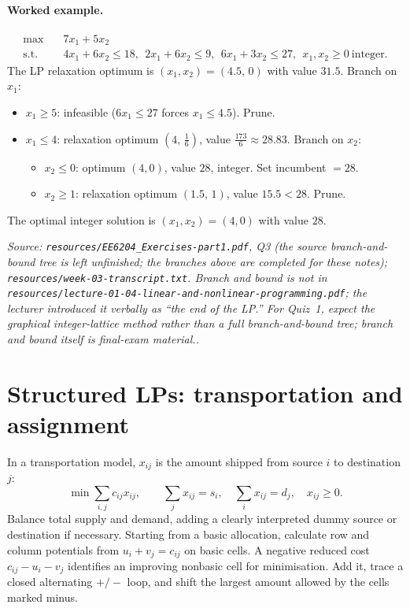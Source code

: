 \documentclass[11pt,a4paper]{article}
\renewcommand{\texttt}[1]{\nolinkurl{#1}}
\newcommand{\source}[1]{\par\smallskip\noindent\textit{Source: #1.}\par\smallskip}
\begin{document}
\paragraph{Worked example.}
\[
\begin{aligned}
 \max\quad&7x_1+5x_2\\
 \text{s.t.}\quad&4x_1+6x_2\leq18,\ \ 2x_1+6x_2\leq9,\ \ 6x_1+3x_2\leq27,\ \ x_1,x_2\geq0\ \text{integer}.
\end{aligned}
\]
The LP relaxation optimum is $(x_1,x_2)=(4.5,\,0)$ with value $31.5$. Branch on $x_1$:
\begin{itemize}
\item $x_1\geq5$: infeasible ($6x_1\leq27$ forces $x_1\leq4.5$). Prune.
\item $x_1\leq4$: relaxation optimum $(4,\,\tfrac16)$, value $\tfrac{173}{6}\approx28.83$. Branch on $x_2$:
 \begin{itemize}
 \item $x_2\leq0$: optimum $(4,0)$, value $28$, integer. Set incumbent $=28$.
 \item $x_2\geq1$: relaxation optimum $(1.5,\,1)$, value $15.5<28$. Prune.
 \end{itemize}
\end{itemize}
The optimal integer solution is $(x_1,x_2)=(4,0)$ with value $28$.
\source{\texttt{resources/EE6204\_Exercises-part1.pdf}, Q3 (the source branch-and-bound tree is left unfinished; the branches above are completed for these notes); \texttt{resources/week-03-transcript.txt}. Branch and bound is \emph{not} in \texttt{resources/lecture-01-04-linear-and-nonlinear-programming.pdf}; the lecturer introduced it verbally as ``the end of the LP.'' For Quiz~1, expect the graphical integer-lattice method rather than a full branch-and-bound tree; branch and bound itself is final-exam material.}

\section{Structured LPs: transportation and assignment}
In a transportation model, $x_{ij}$ is the amount shipped from source $i$ to destination $j$:
\[
 \min\sum_{i,j}c_{ij}x_{ij},\qquad
 \sum_jx_{ij}=s_i,\quad \sum_ix_{ij}=d_j,\quad x_{ij}\geq0.
\]
Balance total supply and demand, adding a clearly interpreted dummy source or destination if necessary. Starting from a basic allocation, calculate row and column potentials from $u_i+v_j=c_{ij}$ on basic cells. A negative reduced cost $c_{ij}-u_i-v_j$ identifies an improving nonbasic cell for minimisation. Add it, trace a closed alternating $+/-$ loop, and shift the largest amount allowed by the cells marked minus.
\end{document}
